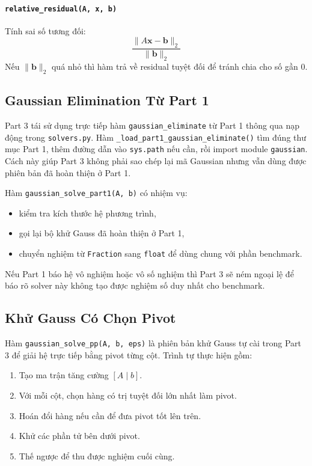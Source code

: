 \documentclass[12pt, a4paper, twoside]{article}
\begin{document}
\paragraph{\texttt{relative\_residual(A, x, b)}}
Tính sai số tương đối:
\[
\frac{\|A\mathbf{x} - \mathbf{b}\|_2}{\|\mathbf{b}\|_2}
\]
Nếu $\|\mathbf{b}\|_2$ quá nhỏ thì hàm trả về residual tuyệt đối để tránh chia cho số gần 0.

\subsection{Gaussian Elimination Từ Part 1}

Part 3 tái sử dụng trực tiếp hàm \texttt{gaussian\_eliminate} từ Part 1 thông qua nạp động trong \texttt{solvers.py}. Hàm \texttt{\_load\_part1\_gaussian\_eliminate()} tìm đúng thư mục Part 1, thêm đường dẫn vào \texttt{sys.path} nếu cần, rồi import module \texttt{gaussian}. Cách này giúp Part 3 không phải sao chép lại mã Gaussian nhưng vẫn dùng được phiên bản đã hoàn thiện ở Part 1.

Hàm \texttt{gaussian\_solve\_part1(A, b)} có nhiệm vụ:
\begin{itemize}
    \item kiểm tra kích thước hệ phương trình,
    \item gọi lại bộ khử Gauss đã hoàn thiện ở Part 1,
    \item chuyển nghiệm từ \texttt{Fraction} sang \texttt{float} để dùng chung với phần benchmark.
\end{itemize}

Nếu Part 1 báo hệ vô nghiệm hoặc vô số nghiệm thì Part 3 sẽ ném ngoại lệ để báo rõ solver này không tạo được nghiệm số duy nhất cho benchmark.

\subsection{Khử Gauss Có Chọn Pivot}

Hàm \texttt{gaussian\_solve\_pp(A, b, eps)} là phiên bản khử Gauss tự cài trong Part 3 để giải hệ trực tiếp bằng pivot từng cột. Trình tự thực hiện gồm:
\begin{enumerate}
    \item Tạo ma trận tăng cường $[A \mid b]$.
    \item Với mỗi cột, chọn hàng có trị tuyệt đối lớn nhất làm pivot.
    \item Hoán đổi hàng nếu cần để đưa pivot tốt lên trên.
    \item Khử các phần tử bên dưới pivot.
    \item Thế ngược để thu được nghiệm cuối cùng.
\end{enumerate}
\end{document}
